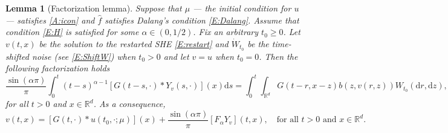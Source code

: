 \documentclass[12pt]{report}
\theoremstyle{plain}
\newtheorem{lemma}[theorem]{Lemma}
\theoremstyle{definition}
\numberwithin{equation}{section}
\newcommand{\R}{\mathbb{R}}
\newcommand{\ud}{\ensuremath{ \mathrm{d} }}
\begin{document}
\begin{lemma}[Factorization lemma] \label{L:Factorize}
	Suppose that $\mu$ --- the initial condition for $u$ --- satisfies \eqref{A:icon} and
	$\widehat{f}$ satisfies Dalang's condition \eqref{E:Dalang}. Assume that condition \eqref{E:H} is
	satisfied for some $\alpha\in (0,1/2)$. Fix an arbitrary $ t_0\ge 0$. Let $v(t,x)$ be the solution
	to the restarted SHE \eqref{E:restart} and $\dot{W}_{t_0}$ be the time-shifted noise (see
	\eqref{E:ShiftW}) when $t_0>0$ and let $v=u$ when $ t_0=0$. Then the following factorization holds
	\begin{equation*}
	\dfrac{\sin(\alpha \pi)}{\pi}
	\int_0^t(t-s)^{\alpha-1}\left[G(t-s,\cdot)*Y_v(s,\cdot)\right](x) \ud s
	= \int_0^t  \int_{\R^d} G(t-r,x-z)b(z,v(r,z)) W_{t_0}(\ud r,\ud z),
	\end{equation*}
	for all $t>0$ and $x\in\R^d$. As a consequence,
	\begin{equation} \label{E:1fac}
	v(t,x)= \left[G(t, \cdot) * u(t_0,\cdot; \mu)\right](x) +\dfrac{\sin(\alpha \pi)}{\pi} \left[F_\alpha Y_v\right](t,x),
	\quad \text{for all $t>0$ and  $x\in\R^d$}.
	\end{equation}
\end{lemma}
\end{document}
